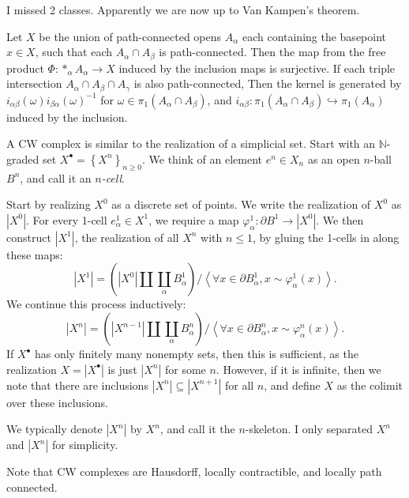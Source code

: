 
I missed 2 classes. Apparently we are now up to Van Kampen's theorem.

\begin{theorem}\label{thm:van-kampen}
	Let $X$ be the union of path-connected opens $A_\alpha $ each containing the basepoint $x\in X$, such that each $A_\alpha \cap A_\beta $ is path-connected. Then the map from the free product $\Phi : *_\alpha A_\alpha  \to X$ induced by the inclusion maps is surjective. If each triple intersection $A_\alpha \cap A_\beta \cap A_\gamma $ is also path-connected, Then the kernel is generated by $i_{\alpha \beta } (\omega )i_{\beta \alpha } (\omega )^{-1} $ for $\omega \in\pi _1(A_\alpha \cap A_\beta )$, and $i_{\alpha \beta } : \pi _1(A_\alpha \cap A_\beta ) \hookrightarrow \pi _1(A_\alpha)$ induced by the inclusion.
\end{theorem}


\begin{construction}
	A CW complex is similar to the realization of a simplicial set. Start with an $\mathbb{N} $-graded set $X^{\bullet} =\left\{ X^n \right\}_{n\geq 0} $. We think of an element $e^n\in X_n$ as an open $n$-ball $B^n$, and call it an \emph{$n$-cell}.

	Start by realizing $X^0$ as a discrete set of points. We write the realization of $X^0$ as $\left| X^0 \right| $. For every 1-cell $e^1_\alpha\in X^1$, we require a map $\varphi_\alpha^1 : \partial B^1 \to \left| X^0 \right| $. We then construct $\left| X^1 \right| $, the realization of all $X^n$ with $n\leq 1$, by gluing the 1-cells in along these maps:
	\[
		\left| X^1 \right| = \left(\left| X^0 \right| \amalg \coprod_{\alpha } B_\alpha ^1 \right)/ \left\langle \forall x\in \partial B^1_\alpha ,x \sim \varphi _\alpha ^1(x) \right\rangle 
	.\]
	We continue this process inductively:
	\[
		\left| X^n \right| =\left( \left| X^{n-1}  \right| \amalg \coprod_{\alpha } B^n_\alpha  \right) / \left\langle \forall x\in \partial B_\alpha ^n, x \sim \varphi_\alpha ^n(x) \right\rangle 
	.\]
	If $X^{\bullet} $ has only finitely many nonempty sets, then this is sufficient, as the realization $X = \left| X^{\bullet}  \right| $ is just $\left| X^n \right| $ for some $n$. However, if it is infinite, then we note that there are inclusions $\left| X^n \right| \subseteq \left| X^{n+1}  \right| $ for all $n$, and define $X$ as the colimit over these inclusions.

	We typically denote $\left| X^n \right| $ by $X^n$, and call it the $n$-skeleton. I only separated $X^n$ and $\left| X^n \right| $ for simplicity.
\end{construction}

Note that CW complexes are Hausdorff, locally contractible, and locally path connected.
